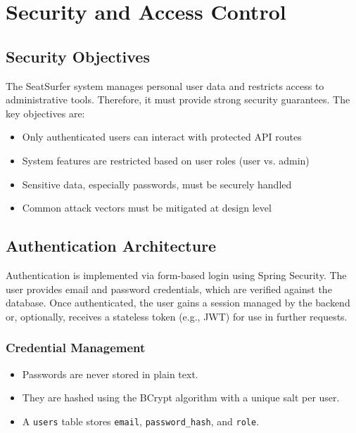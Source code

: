 \documentclass[12pt,a4paper]{report}
\begin{document}
\newpage

\chapter{Security and Access Control}

\section{Security Objectives}

The SeatSurfer system manages personal user data and restricts access to administrative tools. Therefore, it must provide strong security guarantees. The key objectives are:

\begin{itemize}
    \item Only authenticated users can interact with protected API routes
    \item System features are restricted based on user roles (user vs. admin)
    \item Sensitive data, especially passwords, must be securely handled
    \item Common attack vectors must be mitigated at design level
\end{itemize}

\section{Authentication Architecture}

Authentication is implemented via form-based login using Spring Security. The user provides email and password credentials, which are verified against the database. Once authenticated, the user gains a session managed by the backend or, optionally, receives a stateless token (e.g., JWT) for use in further requests.

\subsection*{Credential Management}

\begin{itemize}
    \item Passwords are never stored in plain text.
    \item They are hashed using the BCrypt algorithm with a unique salt per user.
    \item A \verb|users| table stores \verb|email|, \verb|password_hash|, and \verb|role|.
\end{itemize}
\end{document}
